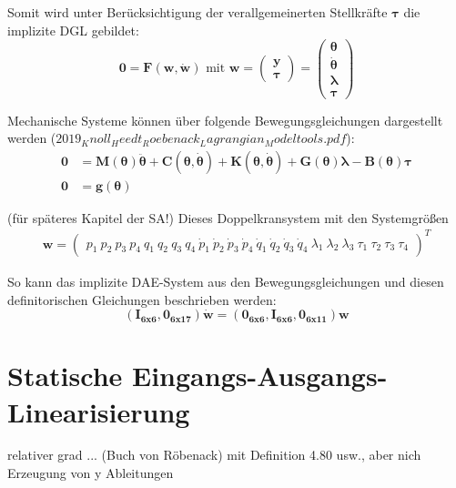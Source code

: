 Somit wird unter Berücksichtigung der verallgemeinerten Stellkräfte $\pmb{\tau}$ die implizite DGL gebildet:
\begin{equation}
	\pmb{0} = \pmb{F(w, \dot{w})} \text{ mit } \pmb{w} 
	=
	\begin{pmatrix}
		\pmb{y} \\
		\hline
		\pmb{\tau}
	\end{pmatrix}
	= 
	\begin{pmatrix}
		\pmb{\theta} \\
		\pmb{\dot{\theta}} \\
		\pmb{\lambda} \\
		\hline
		\pmb{\tau}
	\end{pmatrix}
\end{equation}

Mechanische Systeme können über folgende Bewegungsgleichungen dargestellt werden ($2019_Knoll_Heedt_Roebenack_Lagrangian_Modeltools.pdf$):
\begin{align}
	\pmb{0} &= \pmb{M}(\pmb{\theta}) \pmb{\ddot{\theta}} + \pmb{C}(\pmb{\theta}, \pmb{\dot{\theta}}) + \pmb{K}(\pmb{\theta}, \pmb{\dot{\theta}}) + \pmb{G}(\pmb{\theta}) \pmb{\lambda} - \pmb{B}(\pmb{\theta}) \pmb{\tau} \\
	\pmb{0} &= \pmb{g}(\pmb{\theta}) 
\end{align}

(für späteres Kapitel der SA!)
Dieses Doppelkransystem mit den Systemgrößen
\begin{align}
	\pmb{w}
	=
	\begin{pmatrix}
		p_1 \ p_2 \ p_3 \ p_4 \ q_1 \ q_2 \ q_3 \ q_4 \ \dot{p}_1 \ \dot{p}_2 \ \dot{p}_3 \ \dot{p}_4 \ \dot{q}_1 \ \dot{q}_2 \ \dot{q}_3 \ \dot{q}_4 \ \lambda_1 \ \lambda_2 \ \lambda_3 \ \tau_1 \ \tau_2 \ \tau_3 \ \tau_4
	\end{pmatrix}^T
\end{align}

So kann das implizite DAE-System aus den Bewegungsgleichungen und diesen definitorischen Gleichungen beschrieben werden:
\begin{equation}
	(\pmb{I_{6 x 6}}, \pmb{0_{6 x 17}}) \pmb{\dot{w}} = (\pmb{0_{6 x 6}}, \pmb{I_{6 x 6}}, \pmb{0_{6 x 11}}) \pmb{w}
\end{equation}

\section{Statische Eingangs-Ausgangs-Linearisierung}
relativer grad ... (Buch von Röbenack) mit Definition 4.80 usw., aber nich Erzeugung von y Ableitungen

